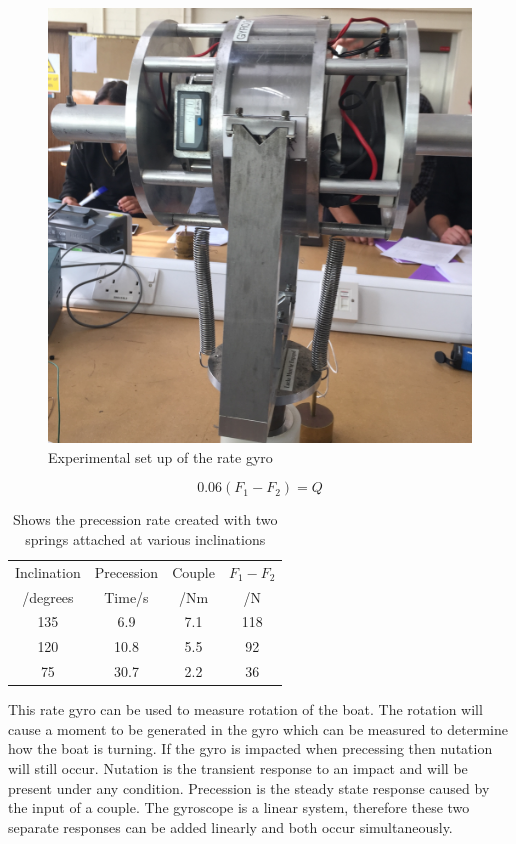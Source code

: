 \documentclass[twoside,twocolumn]{article}
\begin{document}
\begin{figure}[h]
  \centering
    \includegraphics[width=\linewidth]{rg}
  \caption{Experimental set up of the rate gyro}
  \label{fig:rate}
\end{figure}

\begin{equation}
\label{eq:fd}
0.06(F_1-F_2) = Q
\end{equation} 

\begin{table}[h]
\caption{Shows the precession rate created with two springs attached at various inclinations}
\centering
\begin{tabular}{ c | c | c | c }
Inclination & Precession & Couple &$F_1-F_2$ \\
/degrees & Time/s & /Nm &/N \\
\midrule
135 & 6.9 & 7.1 &118 \\
120 & 10.8 & 5.5 &92 \\
75 & 30.7 & 2.2 & 36 \\
\end{tabular}
\label{table:3}
\end{table}

This rate gyro can be used to measure rotation of the boat. The rotation will cause a moment to be generated in the gyro which can be measured to determine how the boat is turning.
\newline
If the gyro is impacted when precessing then nutation will still occur. Nutation is the transient response to an impact and will be present under any condition. Precession is the steady state response caused by the input of a couple. The gyroscope is a linear system, therefore these two separate responses can be added linearly and both occur simultaneously. 
\end{document}
